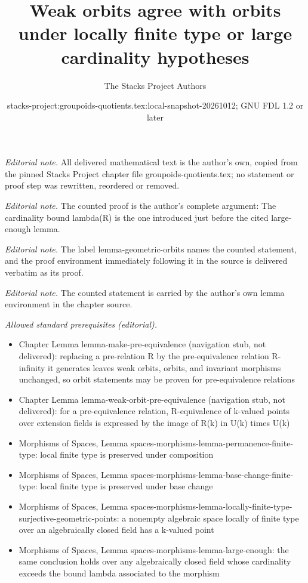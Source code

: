 \documentclass[10pt,a4paper]{amsart}
\title{Weak orbits agree with orbits under locally finite type or large cardinality hypotheses}
\author{The Stacks Project Authors}
\date{stacks-project:groupoids-quotients.tex:local-snapshot-20261012; GNU FDL 1.2 or later}
\theoremstyle{plain}
\theoremstyle{definition}
\theoremstyle{remark}
\numberwithin{equation}{subsection}
\begin{document}
\maketitle
\noindent\textit{Editorial note.} All delivered mathematical text is the author's own, copied from the pinned Stacks Project chapter file groupoids-quotients.tex; no statement or proof step was rewritten, reordered or removed.\par\medskip
\noindent\textit{Editorial note.} The counted proof is the author's complete argument: The cardinality bound lambda(R) is the one introduced just before the cited large-enough lemma.\par\medskip
\noindent\textit{Editorial note.} The label lemma-geometric-orbits names the counted statement, and the proof environment immediately following it in the source is delivered verbatim as its proof.\par\medskip
\noindent\textit{Editorial note.} The counted statement is carried by the author's own lemma environment in the chapter source.\par\medskip
\noindent\textit{Allowed standard prerequisites (editorial).}\begin{itemize}
\item Chapter Lemma lemma-make-pre-equivalence (navigation stub, not delivered): replacing a pre-relation R by the pre-equivalence relation R-infinity it generates leaves weak orbits, orbits, and invariant morphisms unchanged, so orbit statements may be proven for pre-equivalence relations
\item Chapter Lemma lemma-weak-orbit-pre-equivalence (navigation stub, not delivered): for a pre-equivalence relation, R-equivalence of k-valued points over extension fields is expressed by the image of R(k) in U(k) times U(k)
\item Morphisms of Spaces, Lemma spaces-morphisms-lemma-permanence-finite-type: local finite type is preserved under composition
\item Morphisms of Spaces, Lemma spaces-morphisms-lemma-base-change-finite-type: local finite type is preserved under base change
\item Morphisms of Spaces, Lemma spaces-morphisms-lemma-locally-finite-type-surjective-geometric-points: a nonempty algebraic space locally of finite type over an algebraically closed field has a k-valued point
\item Morphisms of Spaces, Lemma spaces-morphisms-lemma-large-enough: the same conclusion holds over any algebraically closed field whose cardinality exceeds the bound lambda associated to the morphism
\end{itemize}\medskip
\end{document}
